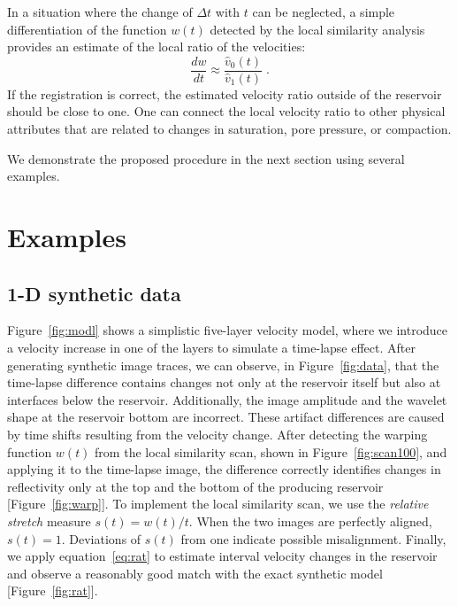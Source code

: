 In a situation where the change of $\Delta t$ with $t$ can be neglected,
 a simple differentiation of the function
$w(t)$ detected by the local similarity analysis provides an estimate
of the local ratio of the velocities:
\begin{equation}
\label{eq:rat}
\frac{d w}{d t} \approx \frac{\hat{v}_0(t)}{\hat{v}_1(t)}\;.
\end{equation}
If the registration is correct, the estimated velocity ratio outside
of the reservoir should be close to one. One can connect
the local velocity ratio to other physical attributes that are
related to changes in saturation, pore pressure, or compaction.

We demonstrate the proposed procedure in the next section using several
 examples.

\section{Examples}

\subsection{1-D synthetic data}


 Figure~\ref{fig:modl} shows a simplistic five-layer velocity model,
 where we introduce a velocity increase in one of the layers to
 simulate a time-lapse effect. After generating synthetic image
 traces, we can observe, in Figure~\ref{fig:data}, that the time-lapse
 difference contains changes not only at the reservoir itself but also
 at interfaces below the reservoir. Additionally, the image amplitude
 and the wavelet shape at the reservoir bottom are incorrect.  These
 artifact differences are caused by time shifts resulting from the
 velocity change. After detecting the warping function $w(t)$ from the
 local similarity scan, shown in Figure~\ref{fig:scan100}, and
 applying it to the time-lapse image, the difference correctly
 identifies changes in reflectivity only at the top and the bottom of
 the producing reservoir [Figure~\ref{fig:warp}]. To implement the
 local similarity scan, we use the \emph{relative stretch} measure
 $s(t) = w(t)/t$. When the two images are perfectly aligned,
 $s(t)=1$. Deviations of $s(t)$ from one indicate possible
 misalignment. Finally, we apply equation~\ref{eq:rat} to estimate
 interval velocity changes in the reservoir and observe a reasonably
 good match with the exact synthetic model [Figure~\ref{fig:rat}].

